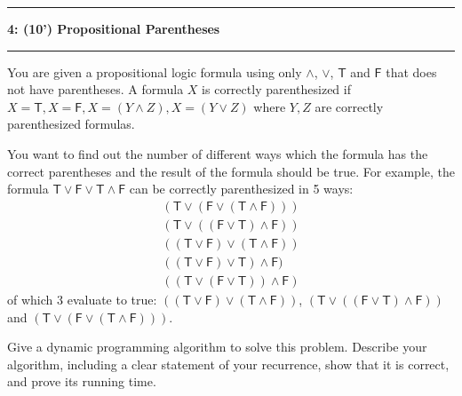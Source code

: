 \documentclass[10.5pt]{article}
\newcommand\question[2]{\vspace{.25in}\hrule\textbf{#1: #2}\vspace{.5em}\hrule\vspace{.10in}}
\begin{document}
\question{4}{(10') Propositional Parentheses}
You are given a propositional logic formula using only $\land$, $\lor$, $\mathsf{T}$ and $\mathsf{F}$ that does not have parentheses. 
A formula $X$ is correctly parenthesized if $X = \mathsf{T}, X = \mathsf{F}, X = (Y \land Z), X = (Y \lor Z)
$ where $Y, Z$ are correctly parenthesized formulas. 

You want to find out the number of different ways which the formula has the correct parentheses and the result of the formula should be true. For example, the formula $\mathsf{T}\lor\mathsf{F}\lor\mathsf{T}\land\mathsf{F}$ can be correctly parenthesized in 5 ways:
\begin{align*}
(\mathsf{T}\lor(\mathsf{F}\lor(\mathsf{T}\land\mathsf{F}))) \\
(\mathsf{T}\lor((\mathsf{F}\lor\mathsf{T})\land\mathsf{F})) \\
((\mathsf{T}\lor\mathsf{F})\lor(\mathsf{T}\land\mathsf{F})) \\
((\mathsf{T}\lor\mathsf{F})\lor\mathsf{T})\land\mathsf{F}) \\
((\mathsf{T}\lor(\mathsf{F}\lor\mathsf{T}))\land\mathsf{F})
\end{align*}
of which 3 evaluate to true: $((\mathsf{T}\lor\mathsf{F})\lor(\mathsf{T}\land\mathsf{F}))$, $(\mathsf{T}\lor((\mathsf{F}\lor\mathsf{T})\land\mathsf{F}))$ and $(\mathsf{T}\lor(\mathsf{F}\lor(\mathsf{T}\land\mathsf{F})))$.

Give a dynamic programming algorithm to solve this problem. Describe your algorithm, including a clear statement of your recurrence, show that it is correct, and prove its running time.
\end{document}
